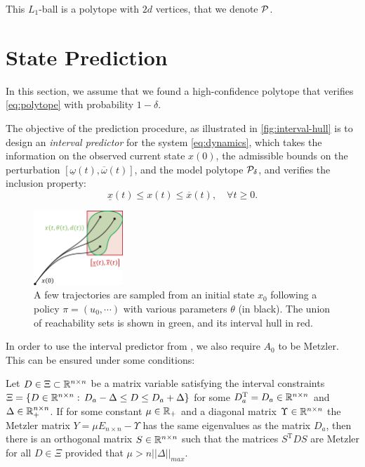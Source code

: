 \documentclass{article}
\begin{document}
This $L_1$-ball is a polytope with $2d$ vertices, that we denote $\mathcal{P}$.

\section{State Prediction}

In this section, we assume that we found a high-confidence polytope that verifies \eqref{eq:polytope} with probability $1-\delta$.

The objective of the prediction procedure, as illustrated in \autoref{fig:interval-hull} is to design an \emph{interval predictor} for the system \eqref{eq:dynamics}, which takes the information on the observed current state ${x}({0})$, the admissible bounds on the perturbation $[\underline{\omega}(t),\overline{\omega}(t)]$, and the model polytope $\mathcal{P}_\delta$, and verifies the inclusion property:
\begin{equation}
\label{eq:interval_property}
\underline{x}(t)\leq x(t)\leq\overline{x}(t),\quad\forall t\geq0.
\end{equation}

\begin{figure}
    \centering
    \includegraphics[width=0.3\textwidth]{img/interval-hull}
    \caption{A few trajectories are sampled from an initial state $x_0$ following a policy $\pi=(u_0,\cdots)$ with various parameters $\theta$ (in black). The union of reachability sets is shown in green, and its interval hull in red.}
    \label{fig:interval-hull}
\end{figure}

In order to use the interval predictor from \citep{leurent2019interval}, we also require $A_0$ to be Metzler. This can be ensured under some conditions:

\begin{lemma}
\label{lem:metzler} Let $D\in\Xi\subset\mathbb{R}^{n\times n}$ be a matrix variable satisfying the interval constraints $\Xi=\{D\in\mathbb{R}^{n\times n}:\,D_{a}-\Delta\le D\le D_{a}+\Delta\}$ for some $D_{a}^{\text{T}}=D_{a}\in\mathbb{R}^{n\times n}$ and $\Delta\in\mathbb{R}_{+}^{n\times n}$. If for some constant $\mu\in\mathbb{R}_{+}$ and a diagonal matrix $\Upsilon\in\mathbb{R}^{n\times n}$ the Metzler matrix $Y=\mu E_{n\times n}-\Upsilon$ has the same eigenvalues as the matrix $D_{a}$, then there is an orthogonal matrix $S\in\mathbb{R}^{n\times n}$ such that the matrices $S^{\text{T}}DS$ are Metzler for all $D\in\Xi$ provided that $\mu>n||\Delta||_{max}$.\textup{ }
\end{lemma}
\end{document}
